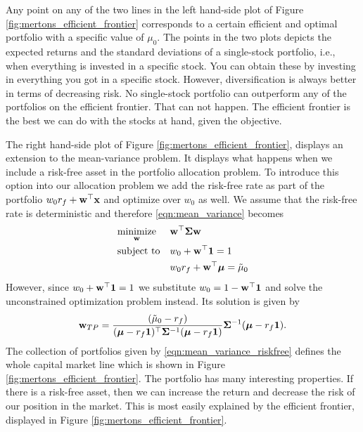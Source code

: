 \documentclass[oneside]{book}\usepackage{knitr}
\begin{document}
Any point on any of the two lines in the left hand-side plot of Figure \ref{fig:mertons_efficient_frontier} corresponds to a certain efficient and optimal portfolio with a specific value of $\mu_0$. 
The points in the two plots depicts the expected returns and the standard deviations of a single-stock portfolio, i.e., when everything is invested in a specific stock. 
You can obtain these by investing in everything you got in a specific stock. 
However, diversification is always better in terms of decreasing risk. 
No single-stock portfolio can outperform any of the portfolios on the efficient frontier. 
That can not happen. 
The efficient frontier is the best we can do with the stocks at hand, given the objective.

The right hand-side plot of Figure \ref{fig:mertons_efficient_frontier}, displays an extension to the mean-variance problem.
It displays what happens when we include a risk-free asset in the portfolio allocation problem. 
To introduce this option into our allocation problem we add the risk-free rate as part of the portfolio $w_0 r_f + \mathbf{w}^\top \mathbf{x}$ and optimize over $w_0$ as well. 
We assume that the risk-free rate is deterministic and therefore \eqref{eqn:mean_variance} becomes 
\begin{equation}\label{eqn:mean_variance_riskfree}
\begin{aligned}
& \underset{\mathbf{w}}{\text{minimize}} 
& & \mathbf{w}^\top \mathbf{\Sigma} \mathbf{w} \\
& \text{subject to}
& & w_0 + \mathbf{w}^\top \mathbf{1} = 1 \\
& && w_0 r_f + \mathbf{w}^\top \mbox{\boldmath$\mu$} = \tilde\mu_0 \\
\end{aligned}
\end{equation}
However, since $w_0 + \mathbf{w}^\top \mathbf{1}=1$ we substitute $w_0=1-\mathbf{w}^\top \mathbf{1}$ and solve the unconstrained optimization problem instead. Its solution is given by 
\begin{equation}\label{eqn:w_mean_variance_riskfree}
  \mathbf{w}_{TP} = \frac{(\tilde\mu_0-r_f)}{(\mbox{\boldmath$\mu$}-r_f \mathbf{1})^\top \mathbf{\Sigma}^{-1} (\mbox{\boldmath$\mu$}-r_f \mathbf{1})} \mathbf{\Sigma}^{-1} (\mbox{\boldmath$\mu$}-r_f \mathbf{1}).
\end{equation}
The collection of portfolios given by \eqref{eqn:mean_variance_riskfree} defines the whole capital market line which is shown in Figure \ref{fig:mertons_efficient_frontier}. 
The portfolio has many interesting properties. 
If there is a risk-free asset, then we can increase the return and decrease the risk of our position in the market. 
This is most easily explained by the efficient frontier, displayed in Figure \ref{fig:mertons_efficient_frontier}. 
\end{document}
